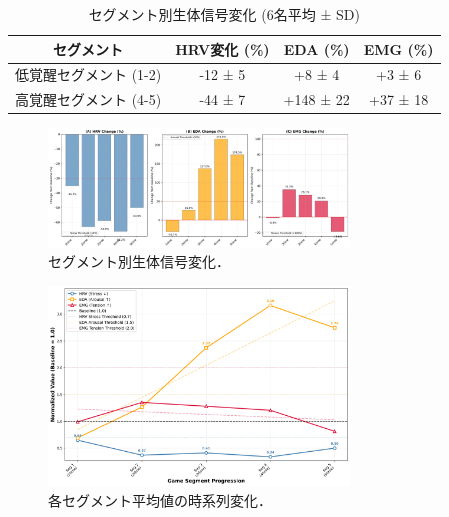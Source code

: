 \documentclass[a4paper]{jarticle}
\begin{document}
\setlength{\tabcolsep}{2pt}
\begin{table}[tp]
\begin{center}
\caption{セグメント別生体信号変化 (6名平均 ± SD)}
\label{table2}
\vspace*{2mm}
\scriptsize
\begin{tabular}{|c|c|c|c|}\hline
\textbf{セグメント} & \textbf{HRV変化 (\%)} & \textbf{EDA (\%)} & \textbf{EMG (\%)} \\
\hline
低覚醒セグメント (1-2) & -12 ± 5 & +8 ± 4 & +3 ± 6 \\
\hline
高覚醒セグメント (4-5) & -44 ± 7 & +148 ± 22 & +37 ± 18 \\
\hline
\end{tabular}
\vspace*{-3mm}
\end{center}
\end{table}

\begin{figure}[tp]
  \begin{center}
    \includegraphics*[width=80mm]{figure6_segment_comparison.png}
  \end{center}
  \vspace*{-6mm}
  \caption{セグメント別生体信号変化．}
  \label{figure6}
\end{figure}

\begin{figure}[tp]
  \begin{center}
    \includegraphics*[width=80mm]{figure7_temporal_progression.png}
  \end{center}
  \vspace*{-6mm}
  \caption{各セグメント平均値の時系列変化．}
    \label{figure7}
\end{figure}
\end{document}
